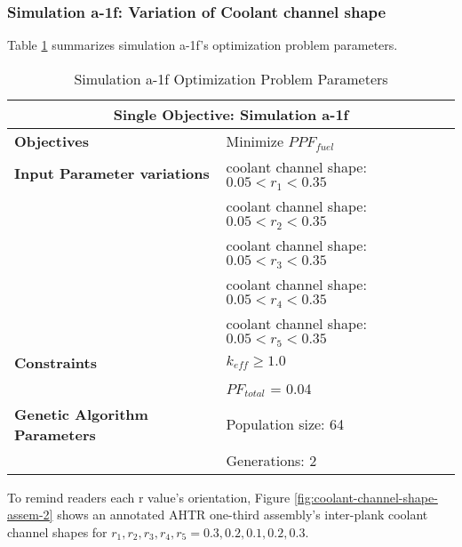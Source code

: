 \subsubsection{Simulation a-1f: Variation of Coolant channel shape}
Table \ref{tab:simulationa1f} summarizes simulation a-1f's optimization problem parameters. 
\begin{table}[htbp!]
    \centering
    \onehalfspacing
    \caption{Simulation a-1f Optimization Problem Parameters}
	\label{tab:simulationa1f}
    \footnotesize
    \begin{tabular}{l|p{6cm}}
    \hline 
    \multicolumn{2}{c}{\textbf{Single Objective: Simulation a-1f}} \\
    \hline 
    \textbf{Objectives} & Minimize $PPF_{fuel}$ \\
    \hline 
    \textbf{Input Parameter variations} 
    & coolant channel shape: $0.05<r_{1}<0.35$ \\
    & coolant channel shape: $0.05<r_{2}<0.35$ \\
    & coolant channel shape: $0.05<r_{3}<0.35$ \\
    & coolant channel shape: $0.05<r_{4}<0.35$ \\
    & coolant channel shape: $0.05<r_{5}<0.35$ \\
    \hline
    \textbf{Constraints} & $k_{eff} \geq 1.0$\\ 
    & $PF_{total}$ = 0.04 \\
    \hline 
    \textbf{Genetic Algorithm Parameters} & Population size: 64 \\
    & Generations: 2 \\
    \hline
    \end{tabular}
\end{table}
To remind readers each r value's orientation, Figure 
\ref{fig:coolant-channel-shape-assem-2} shows an annotated \gls{AHTR} one-third 
assembly's inter-plank coolant channel shapes for 
$r_1, r_2, r_3, r_4, r_5 = 0.3, 0.2, 0.1, 0.2, 0.3$.

